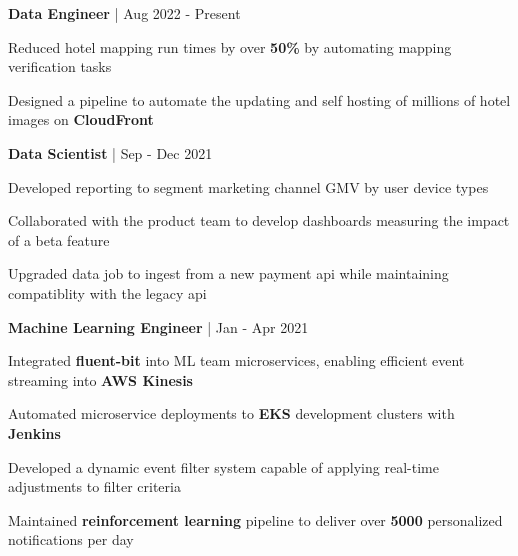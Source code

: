 


\begin{cventries}

\cventry
{\textbf{Data Engineer} | \color{awesome}{Super}}
{Aug 2022 - Present} %
{ %
\begin{cvitems}
\item {Reduced hotel mapping run times by over \textbf{50\%} by automating mapping verification tasks}
\item {Designed a pipeline to automate the updating and self hosting of millions of hotel images on \textbf{CloudFront}}
\end{cvitems}
}

\cventry
{\textbf{Data Scientist} | \color{awesome}{Shopify}}
{Sep - Dec 2021} %
{ %
\begin{cvitems}
\item {Developed reporting to segment marketing channel GMV by user device types}
\item {Collaborated with the product team to develop dashboards measuring the impact of a beta feature}
\item {Upgraded data job to ingest from a new payment api while maintaining compatiblity with the legacy api}
\end{cvitems}
}

\cventry
{\textbf{Machine Learning Engineer} | \color{awesome}{Zynga}}
{Jan - Apr 2021} %
{ %
\begin{cvitems}
\item{Integrated \textbf{fluent-bit} into ML team microservices, enabling efficient event streaming into \textbf{AWS Kinesis}}
\item {Automated microservice deployments to \textbf{EKS} development clusters with \textbf{Jenkins}}
\item{Developed a dynamic event filter system capable of applying real-time adjustments to filter criteria}
\item {Maintained \textbf{reinforcement learning} pipeline to deliver over \textbf{5000} personalized notifications per day}
\end{cvitems}
}


\end{cventries}
